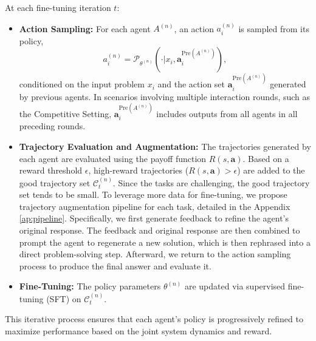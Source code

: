 At each fine-tuning iteration $t$:
\begin{itemize}
    \item \textbf{Action Sampling:} For each agent \( A^{(n)} \), an action \( a_i^{(n)} \) is sampled from its policy, 
    \[
    a_i^{(n)} = \mathcal{P}_{\theta^{(n)}}(\cdot | x_i, \mathbf{a}_i^{\mathrm{Pre}(A^{(n)})}),
    \]
    conditioned on the input problem $x_i$ and the action set \( \mathbf{a}_i^{\mathrm{Pre}(A^{(n)})} \) generated by previous agents. In scenarios involving multiple interaction rounds, such as the Competitive Setting, \( \mathbf{a}_i^{\mathrm{Pre}(A^{(n)})} \) includes outputs from all agents in all preceding rounds.
    \item \textbf{Trajectory Evaluation and Augmentation:} The trajectories generated by each agent are evaluated using the payoff function $R(s, \mathbf{a})$. Based on a reward threshold $\epsilon$,  
    high-reward trajectories ($R(s, \mathbf{a}) > \epsilon$) are added to the good trajectory set $\mathcal{C}_{t}^{(n)}$. Since the tasks are challenging, the good trajectory set tends to be small. To leverage more data for fine-tuning, we propose trajectory augmentation pipeline for each task, detailed in the Appendix \ref{ap:pipeline}. Specifically, we first generate feedback to refine the agent's original response.
    The feedback and original response are then combined to prompt the agent to regenerate a new solution, which is then rephrased into a direct problem-solving step. Afterward, we return to the action sampling process to produce the final answer and evaluate it. 

    \item \textbf{Fine-Tuning:} The policy parameters $\theta^{(n)}$ are updated via supervised fine-tuning (SFT) on $\mathcal{C}_{t}^{(n)}$.
\end{itemize}

This iterative process ensures that each agent's policy is progressively refined to maximize performance based on the joint system dynamics and reward. 

